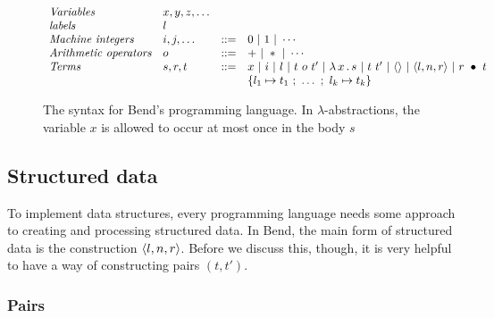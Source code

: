 \documentclass{article}
\begin{document}
\begin{figure}
  \[
  \begin{array}{llll}
    \textit{Variables}  & x,y,z,\ldots & \ &\ \\
    \textit{labels}  & l & \ &\ \\ 
    \textit{Machine integers}  & i,j,\ldots & ::= & 0\ |\ 1\ | \ \cdots \\
    \textit{Arithmetic operators} & o & ::= & +\ |\ *\ |\ \cdots \\        
    \textit{Terms} & s,r,t & ::= & x\ |\ i\ |\ l\ |\ t\ o\ t'\ |\ \lam{x}{s}\ |\ t\ t'\ |\ \wunit\ |\ \ctor{l}{n}{r}\ |\ \wrec{r}{t} \\
    \ &\ &\ & \{ l_1 \mapsto t_1\ ;\ \ldots\ ;\ l_k\mapsto t_k \}
  \end{array}
\]
\caption{The syntax for Bend's programming language.  In $\lambda$-abstractions, the variable $x$ is allowed
  to occur at most once in the body $s$}
\label{fig:pl}
\end{figure}

\subsection{Structured data}

To implement data structures, every programming language needs some
approach to creating and processing structured data.  In Bend, the
main form of structured data is the construction $\langle l , n, r \rangle$.
Before we discuss this, though, it is very helpful to have a way of
constructing pairs $(t,t')$.

\subsubsection{Pairs}
\end{document}
